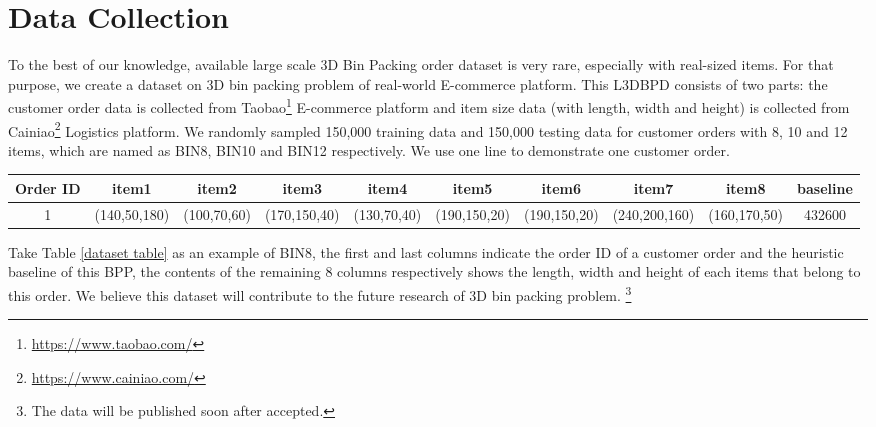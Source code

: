 \section{Data Collection}
\label{sec:data}

To the best of our knowledge, available large scale 3D Bin Packing order dataset is very rare, especially with real-sized items. For that purpose, we create a dataset on 3D bin packing problem of real-world E-commerce platform. This L3DBPD consists of two parts: the customer order data is collected from Taobao\footnote{\url{https://www.taobao.com/}} E-commerce platform and item size data (with length, width and height) is collected from Cainiao\footnote{\url{https://www.cainiao.com/}} Logistics platform. We randomly sampled 150,000 training data and 150,000 testing data for customer orders with 8, 10 and 12 items, which are named as BIN8, BIN10 and BIN12 respectively. We use one line to demonstrate one customer order.

\begin{table*}[!h]
	\small
	\centering
	\caption{Examples of L3DBPD. }
	\label{dataset table}
	\begin{tabular}{|c| c | c | c | c | c | c | c | c | c |}
		\hline
		Order ID & item1  & item2 & item3 & item4  & item5 & item6 & item7  & item8  &  baseline \\  \hline
		1   & (140,50,180) & (100,70,60)  & (170,150,40) & (130,70,40) & (190,150,20)  & (190,150,20) & (240,200,160) &
		(160,170,50)  & 432600  \\ \hline
	\end{tabular}
\end{table*}


Take Table \ref{dataset table} as an example of BIN8, the first and last columns indicate the order ID of a customer order and the heuristic baseline of this BPP, the contents of the remaining 8 columns respectively shows the length, width and height of each items that belong to this order.
We believe this dataset will contribute to the future research of 3D bin packing problem. \footnote{The data will be published soon after accepted.}
